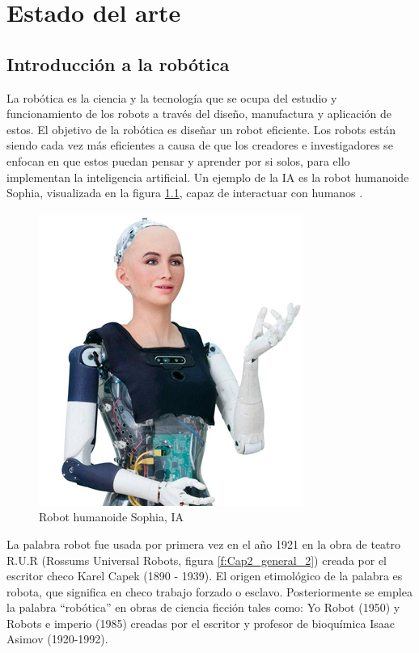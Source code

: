 \chapter{Estado del arte}\label{CAP2}


\section{Introducción a la robótica}
    La robótica es la ciencia y la tecnología que se ocupa del estudio y funcionamiento de los robots a través del diseño, manufactura y aplicación de estos. El objetivo de la robótica es diseñar un robot eficiente. Los robots están siendo cada vez más eficientes a causa de que los creadores e investigadores se enfocan en que estos puedan pensar y aprender por si solos, para ello implementan la inteligencia artificial. Un ejemplo de la IA es la robot humanoide Sophia, visualizada en la figura \ref{f:Cap2_general_1}, capaz de interactuar con humanos .
    
    \begin{figure}[htb]
        \centering
        \includegraphics[width=0.3\linewidth]{Main/Chapter2/Images2/Robot-humanoideSophiaIA.png}
        \caption{Robot humanoide Sophia, IA \cite{robot_sofi}} 
        \label{f:Cap2_general_1}
    \end{figure}   
    
    La palabra robot fue usada por primera vez en el año 1921 en la obra de teatro R.U.R (Rossums Universal Robots, figura \ref{f:Cap2_general_2}) creada por el escritor checo Karel Capek (1890 - 1939). El origen etimológico de la palabra es robota, que significa en checo trabajo forzado o esclavo. Posteriormente se emplea la palabra ``robótica'' en obras de ciencia ficción tales como: Yo Robot (1950) y Robots e imperio (1985) creadas por el escritor y profesor de bioquímica Isaac Asimov (1920-1992).
    
    \newpage
    
